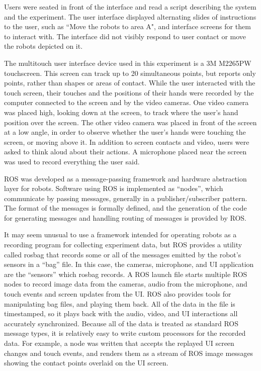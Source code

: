 Users were seated in front of the interface and read a script describing the system and the experiment. The user interface displayed alternating slides of instructions to the user, such as ``Move the robots to area A", and interface screens for them to interact with. 
The interface did not visibly respond to user contact or move the robots depicted on it.

The multitouch user interface device used in this experiment is a 3M M2265PW touchscreen. 
This screen can track up to 20 simultaneous points, but reports only points, rather than shapes or areas of contact. 
While the user interacted with the touch screen, their touches and the positions of their hands were recorded by the computer connected to the screen and by the video cameras. 
One video camera was placed high, looking down at the screen, to track where the user's hand position over the screen. 
The other video camera was placed in front of the screen at a low angle, in order to observe whether the user's hands were touching the screen, or moving above it. 
In addition to screen contacts and video, users were asked to think aloud about their actions.
A microphone placed near the screen was used to record everything the user said. 

ROS was developed as a message-passing framework and hardware abstraction layer for robots. 
Software using ROS is implemented as ``nodes'', which communicate by passing messages, generally in a publisher/subscriber pattern. 
The format of the messages is formally defined, and the generation of the code for generating messages and handling routing of messages is provided by ROS. 

It may seem unusual to use a framework intended for operating robots as a recording program for collecting experiment data, but ROS provides a utility called rosbag that records some or all of the messages emitted by the robot's sensors in a ``bag'' file. 
In this case, the cameras, microphone, and UI application are the ``sensors'' which rosbag records.
A ROS launch file starts multiple ROS nodes to record image data from the cameras, audio from the microphone, and touch events and screen updates from the UI.
ROS also provides tools for manipulating bag files, and playing them back. 
All of the data in the file is timestamped, so it plays back with the audio, video, and UI interactions all accurately synchronized. 
Because all of the data is treated as standard ROS message types, it is relatively easy to write custom processors for the recorded data.
For example, a node was written that accepts the replayed UI screen changes and touch events, and renders them as a stream of ROS image messages showing the contact points overlaid on the UI screen. 


